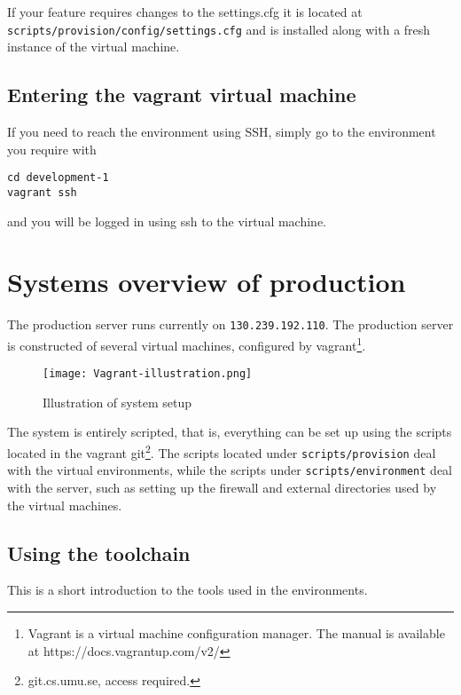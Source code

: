 If your feature requires changes to the settings.cfg it is located at
\texttt{scripts/provision/config/settings.cfg} and is installed along
with a fresh instance of the virtual machine.

\subsection{Entering the vagrant virtual
machine}\label{entering-the-vagrant-virtual-machine}

If you need to reach the environment using SSH, simply go to the
environment you require with

\begin{verbatim}
cd development-1
vagrant ssh
\end{verbatim}

and you will be logged in using ssh to the virtual machine.

\section{Systems overview of
production}\label{systems-overview-of-production}

The production server runs currently on \texttt{130.239.192.110}. The
production server is constructed of several virtual machines, configured
by vagrant\footnote{Vagrant is a virtual machine configuration manager.
  The manual is available at https://docs.vagrantup.com/v2/}.

\begin{figure}[htbp]
\centering
\texttt{[image: Vagrant-illustration.png]}
\caption{Illustration of system setup}
\end{figure}

The system is entirely scripted, that is, everything can be set up using
the scripts located in the vagrant git\footnote{git.cs.umu.se, access required.}. The
scripts located under \texttt{scripts/provision} deal with the virtual
environments, while the scripts under \texttt{scripts/environment} deal
with the server, such as setting up the firewall and external
directories used by the virtual machines.

\subsection{Using the toolchain}\label{using-the-toolchain}

This is a short introduction to the tools used in the environments.

